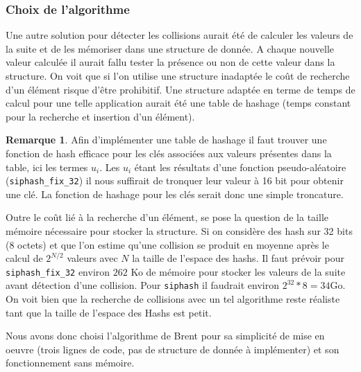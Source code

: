 \documentclass[11pt]{article}
\theoremstyle{definition}
\theoremstyle{definition}
\newtheorem*{myrem}{Remarque}
\theoremstyle{definition}
\theoremstyle{theorem}
\theoremstyle{definition}
\begin{document}
\subsubsection{Choix de l'algorithme}
Une autre solution pour détecter les collisions aurait été de calculer les valeurs de la suite et
de les mémoriser dans une structure de donnée. A chaque nouvelle valeur calculée il aurait fallu tester la présence ou non de cette valeur dans la structure. On voit que si l'on utilise une structure inadaptée le
coût de recherche d'un élément risque d'être prohibitif.
Une structure adaptée en terme de temps de calcul pour une telle application aurait été une table de hashage (temps constant pour la recherche et insertion d'un élément).
\begin{myrem}
  Afin d'implémenter une table de hashage il faut trouver une fonction de hash efficace
  pour les clés associées aux valeurs présentes dans la table, ici les termes $u_i$.
  Les $u_i$ étant les résultats d'une fonction pseudo-aléatoire (\texttt{siphash\_fix\_32})
  il nous suffirait de tronquer leur valeur à 16 bit pour obtenir une clé.
  La fonction de hashage pour les clés serait donc une simple troncature.
\end{myrem}
Outre le coût lié à la recherche d'un élément, se pose la question de la taille mémoire nécessaire pour stocker la structure.
Si on considère des hash sur 32 bits (8 octets) et que l'on estime qu'une collision se produit en moyenne après le calcul de $2^{N/2}$ valeurs avec $N$ la taille de l'espace des hashs. Il faut prévoir pour \texttt{siphash\_fix\_32} environ $262$ Ko de mémoire pour stocker les valeurs de la suite avant détection d'une collision.
Pour \texttt{siphash} il faudrait environ $2^{32}*8 = 34$Go. On voit bien que la recherche de collisions
avec un tel algorithme reste réaliste tant que la taille de l'espace des Hashs est petit.

Nous avons donc choisi l'algorithme de Brent pour sa simplicité de mise en oeuvre (trois lignes de code, pas de structure de donnée à implémenter) et son fonctionnement sans mémoire.
\end{document}
